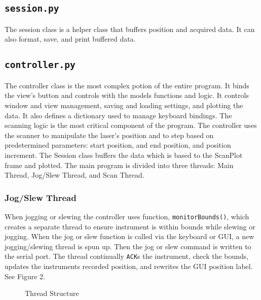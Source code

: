 \documentclass[11pt]{article}
\begin{document}
\subsection{\texttt{session.py}}
The session class is a helper class that buffers position and acquired data. It can also format, save, and print buffered data.
\subsection{\texttt{controller.py}}
The controller class is the most complex potion of the entire program. It binds the view's button and controls with the models functions and logic. It  controls window and view management, saving and loading settings, and plotting the data. It also defines a dictionary used to manage keyboard bindings. 
The scanning logic is the most critical component of the program. The controller uses the scanner to manipulate the laser's position and to step  based on predetermined parameters: start position, and end position, and position increment. The Session class buffers the data which is based to the ScanPlot frame and plotted. The main program  is divided into three threads: Main Thread, Jog/Slew Thread, and Scan Thread.
\subsubsection{Jog/Slew Thread}
When jogging or slewing the controller uses function, \texttt{monitorBounds()}, which creates a separate thread to ensure instrument is within bounds while slewing or jogging.  
When the jog or slew function is called via the keyboard or GUI, a new jogging/slewing thread is spun up. Then the jog or slew command is written to the serial port. The thread continually \texttt{ACK}s the instrument, check the bounds, updates the instruments recorded position, and rewrites the GUI position label.  See Figure 2.

\begin{figure}[h]
    \centering
    \caption{Thread Structure}
\end{figure} 
\end{document}

